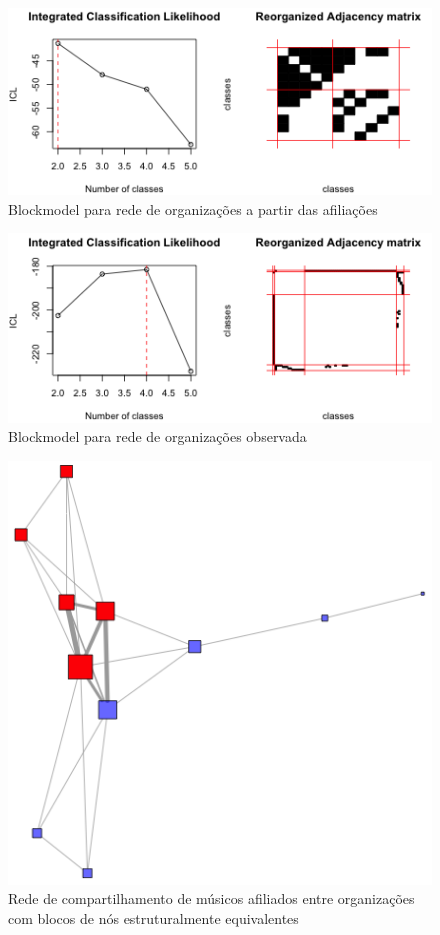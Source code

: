 \documentclass[a4paper, 12pt, openright, oneside, german, french, english, brazil]{abntex2}
\begin{document}
	
	\begin{figure}[!ht]
		\centering
		\caption{Blockmodel para rede de organizações a partir das afiliações}
		\label{sbmout:mesonivel2}
		\includegraphics[scale=.8]{blockmesonivel2.png}
	\end{figure}

	\begin{figure}[!ht]
		\centering
		\caption{Blockmodel para rede de organizações observada}
		\label{sbmout:orgs}
		\includegraphics[scale=.8]{blockoutorgs.png}
	\end{figure}

	\begin{figure}[!ht]
		\centering
		\caption{Rede de compartilhamento de músicos afiliados entre organizações com blocos de nós estruturalmente equivalentes}
		\label{blocos:mesonivel2}
		\includegraphics[scale=.7]{block_rede_mesonivel2.png}
	\end{figure}
	
\end{document}
